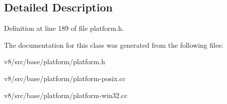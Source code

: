 \subsection{Detailed Description}


Definition at line 189 of file platform.\+h.



The documentation for this class was generated from the following files\+:\begin{DoxyCompactItemize}
\item 
v8/src/base/platform/platform.\+h\item 
v8/src/base/platform/platform-\/posix.\+cc\item 
v8/src/base/platform/platform-\/win32.\+cc\end{DoxyCompactItemize}
